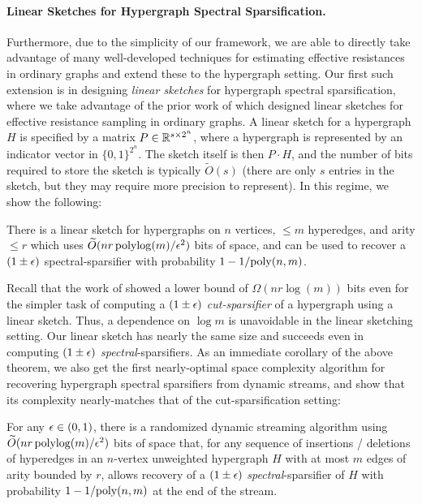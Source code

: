 \documentclass{article}
\begin{document}
\paragraph{Linear Sketches for Hypergraph Spectral Sparsification.} Furthermore,
due to the simplicity of our framework, we are able to directly take advantage of many well-developed techniques for estimating effective resistances in ordinary graphs and extend these to the hypergraph setting. Our first such extension is in designing \emph{linear sketches} for hypergraph spectral sparsification, where we take advantage of the prior work of \cite{KLMMS14} which designed linear sketches for effective resistance sampling in ordinary graphs. A linear sketch for a hypergraph $H$ is specified by a matrix $ P \in \mathbb{R}^{s \times 2^n}$, where a hypergraph is represented by an indicator vector in $\{0,1\}^{2^n}$. The sketch itself is then $P \cdot H$, and the number of bits required to store the sketch is typically $\widetilde{O}(s)$ (there are only $s$ entries in the sketch, but they may require more precision to represent). In this regime, we show the following:

\begin{theorem}\label{thm:linearSketchintro}
    There is a linear sketch for hypergraphs on $n$ vertices, $\leq m$ hyperedges, and arity $\leq r$ which uses $\widetilde{O}(n r \operatorname{polylog}(m) / \epsilon^2)$ bits of space, and can be used to recover a $(1 \pm \epsilon)$ spectral-sparsifier with probability $1 - 1 / \mathrm{poly}(n,m)$.
\end{theorem}

Recall that the work of \cite{KPS24c} showed a lower bound of $\Omega(nr \log(m))$ bits even for the simpler task of computing a $(1 \pm \epsilon)$ \emph{cut-sparsifier} of a hypergraph using a linear sketch.
Thus, a dependence on $\log m$ is unavoidable in the linear sketching setting.
Our linear sketch has nearly the same size and succeeds even in computing $(1 \pm \epsilon)$ \emph{spectral}-sparsifiers. As an immediate corollary of the above theorem, we also get the first nearly-optimal space complexity algorithm for recovering hypergraph spectral sparsifiers from dynamic streams, and show that its complexity nearly-matches that of the cut-sparsification setting:

\begin{corollary}\label{cor:dynamicStreamingintro}
    For any $\epsilon \in (0,1)$, there is a randomized dynamic streaming algorithm using $\widetilde{O}(nr \operatorname{polylog}(m) / \epsilon^2)$ bits of space that, for any sequence of insertions / deletions of hyperedges in an $n$-vertex unweighted hypergraph $H$ with at most $m$ edges of arity bounded by $r$, allows recovery of a $(1 \pm \epsilon)$ \emph{spectral}-sparsifier of $H$ with probability $1 - 1 / \mathrm{poly}(n,m)$ at the end of the stream.
\end{corollary}
\end{document}
